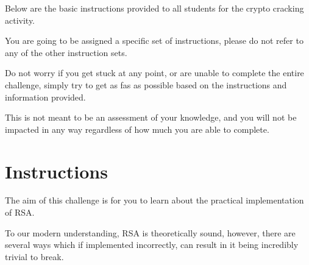             Below are the basic instructions provided to all students for the crypto cracking activity.







            {\parindent0pt\singlespacing                







                    You are going to be assigned a specific set of instructions, please do not refer to any of the other instruction sets.







                    Do not worry if you get stuck at any point, or are unable to complete the entire challenge, simply try to get as fas as possible based on the instructions and information provided. %







This is not meant to be an assessment of your knowledge, and you will not be impacted in any way regardless of how much you are able to complete. 







                







                \section*{Instructions}







                    The aim of this challenge is for you to learn about the practical implementation of RSA.















                    To our modern understanding, RSA is theoretically sound, however, there are several ways which if implemented incorrectly, can result in it being incredibly trivial to break. 







}
